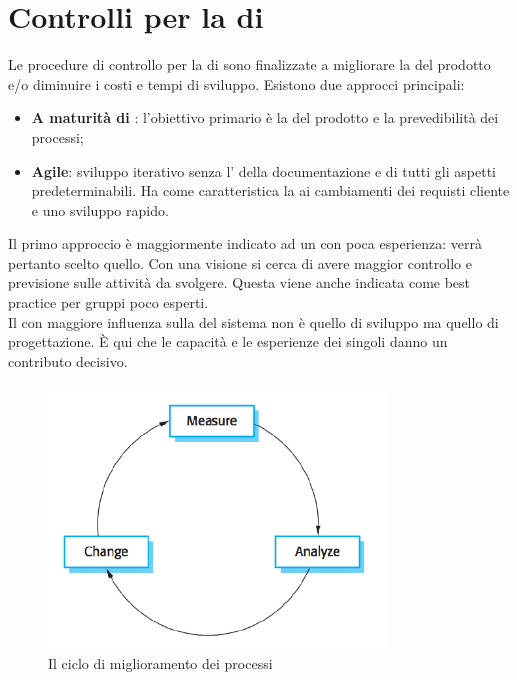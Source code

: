 \section{Controlli per la  di }
Le procedure di controllo per la  di  sono finalizzate a migliorare la  del prodotto e/o diminuire i costi e tempi di sviluppo. Esistono due approcci principali:
\begin{itemize}
\item \textbf{A maturità di }: l'obiettivo primario è la  del prodotto e la prevedibilità dei processi;
\item \textbf{Agile}: sviluppo iterativo senza l' della documentazione e di tutti gli aspetti predeterminabili. Ha come caratteristica la  ai cambiamenti dei requisti cliente e uno sviluppo rapido.
\end{itemize}
Il primo approccio è maggiormente indicato ad un  con poca esperienza: verrà pertanto scelto quello. Con una visione  si cerca di avere maggior controllo e previsione sulle attività da svolgere. Questa viene anche indicata come best practice per gruppi poco esperti.\\
Il  con maggiore influenza sulla  del sistema non è quello di sviluppo ma quello di progettazione. È qui che le capacità e le esperienze dei singoli danno un contributo decisivo.\\
\begin{figure}[h]
\centering \includegraphics[width=0.8\textwidth]{res/sections/processImprovement.png}
\caption{Il ciclo di miglioramento dei processi}
\end{figure}
